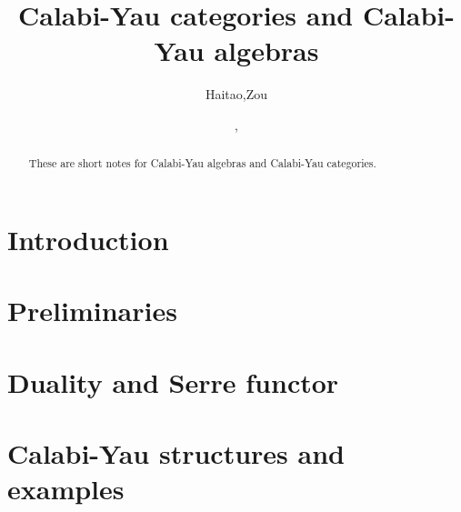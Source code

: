 \documentclass[12pt,twoside]{article}
\title{Calabi-Yau categories and Calabi-Yau algebras}
\date{\number\year, \semester}
\author{Haitao,Zou}
\begin{document}
\maketitle
\begin{abstract}
    These are short notes for Calabi-Yau algebras and Calabi-Yau categories.
\end{abstract}
%
\tableofcontents
\newpage

\section{Introduction}
	
\section{Preliminaries}
	
\section{Duality and Serre functor}
    

\section{Calabi-Yau structures and examples}
    
%    
\newpage


\end{document}
